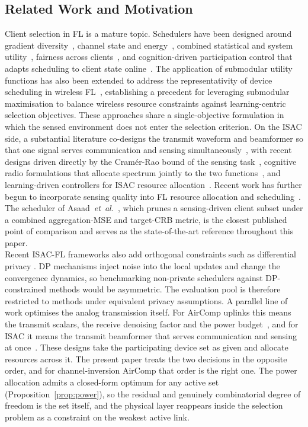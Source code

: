 \documentclass[lettersize,journal]{IEEEtran}
\begin{document}
\subsection{Related Work and Motivation}
Client selection in FL is a mature topic. Schedulers have been designed around gradient diversity~\cite{balakrishnan2022divfl}, channel state and energy~\cite{yang2020energy,amiri2021scheduling}, combined statistical and system utility~\cite{lai2021oort}, fairness across clients~\cite{li2020fairfl}, and cognition-driven participation control that adapts scheduling to client state online~\cite{lai2026cognition}. The application of submodular utility functions has also been extended to address the representativity of device scheduling in wireless FL~\cite{chen2024exploring}, establishing a precedent for leveraging submodular maximisation to balance wireless resource constraints against learning-centric selection objectives. These approaches share a single-objective formulation in which the sensed environment does not enter the selection criterion. On the ISAC side, a substantial literature co-designs the transmit waveform and beamformer so that one signal serves communication and sensing simultaneously~\cite{liu2020beamforming}, with recent designs driven directly by the Cram\'er-Rao bound of the sensing task~\cite{wang2024cramer,zhou2026crb}, cognitive radio formulations that allocate spectrum jointly to the two functions~\cite{galappaththige2026}, and learning-driven controllers for ISAC resource allocation~\cite{jiang2026marl}. Recent work has further begun to incorporate sensing quality into FL resource allocation and scheduling~\cite{wen2023isacfl,zheng2024otafliscc,du2024fediscc,wen2025isccairfeel,zhang2026isccfl,asaad2025}. The scheduler of Asaad~\emph{et~al.}~\cite{asaad2025}, which prunes a sensing-driven client subset under a combined aggregation-MSE and target-CRB metric, is the closest published point of comparison and serves as the state-of-the-art reference throughout this paper. \\
Recent ISAC-FL frameworks also add orthogonal constraints such as differential privacy \cite{hu2025differentially}. DP mechanisms inject noise into the local updates and change the convergence dynamics, so benchmarking non-private schedulers against DP-constrained methods would be asymmetric. The evaluation pool is therefore restricted to methods under equivalent privacy assumptions.
A parallel line of work optimises the analog transmission itself. For AirComp uplinks this means the transmit scalars, the receive denoising factor and the power budget~\cite{zhu2020broadband,cao2022optimized}, and for ISAC it means the transmit beamformer that serves communication and sensing at once~\cite{liu2020beamforming,wang2024cramer}. These designs take the participating device set as given and allocate resources across it. The present paper treats the two decisions in the opposite order, and for channel-inversion AirComp that order is the right one. The power allocation admits a closed-form optimum for any active set (Proposition~\ref{prop:power}), so the residual and genuinely combinatorial degree of freedom is the set itself, and the physical layer reappears inside the selection problem as a constraint on the weakest active link.
\end{document}
